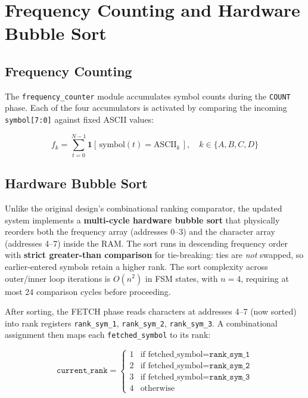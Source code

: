 \documentclass[12pt,a4paper]{article}
\begin{document}
\section{Frequency Counting and Hardware Bubble Sort}

\subsection{Frequency Counting}
The \texttt{frequency\_counter} module accumulates symbol counts during the
\texttt{COUNT} phase. Each of the four accumulators is activated by comparing the
incoming \texttt{symbol[7:0]} against fixed ASCII values:

\begin{equation}
  f_k = \sum_{t=0}^{N-1} \mathbf{1}\!\left[\,\text{symbol}(t) = \text{ASCII}_k\,\right],
  \quad k \in \{A, B, C, D\}
\end{equation}

\subsection{Hardware Bubble Sort}
Unlike the original design's combinational ranking comparator, the updated system
implements a \textbf{multi-cycle hardware bubble sort} that physically reorders both
the frequency array (addresses 0--3) and the character array (addresses 4--7) inside the
RAM. The sort runs in descending frequency order with \textbf{strict greater-than
comparison} for tie-breaking: ties are \emph{not} swapped, so earlier-entered symbols
retain a higher rank. The sort complexity across outer/inner loop iterations is $O(n^2)$
in FSM states, with $n = 4$, requiring at most 24 comparison cycles before proceeding.

After sorting, the FETCH phase reads characters at addresses 4--7 (now sorted) into
rank registers \texttt{rank\_sym\_1}, \texttt{rank\_sym\_2}, \texttt{rank\_sym\_3}.
A combinational assignment then maps each \texttt{fetched\_symbol} to its rank:

\begin{equation}
  \texttt{current\_rank} =
  \begin{cases}
    1 & \text{if fetched\_symbol} = \texttt{rank\_sym\_1} \\
    2 & \text{if fetched\_symbol} = \texttt{rank\_sym\_2} \\
    3 & \text{if fetched\_symbol} = \texttt{rank\_sym\_3} \\
    4 & \text{otherwise}
  \end{cases}
\end{equation}
\end{document}
